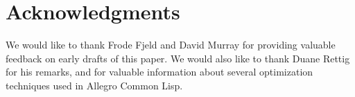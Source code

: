 \section{Acknowledgments} 

We would like to thank Frode Fjeld and David Murray for providing
valuable feedback on early drafts of this paper.  We would also like
to thank Duane Rettig for his remarks, and for valuable information
about several optimization techniques used in Allegro Common Lisp.
